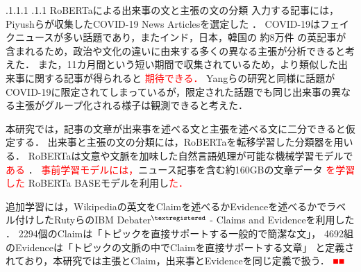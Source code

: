 \documentclass[a4paper, twocolumn, 10pt]{jarticle}
\makeatletter
\def\subsection{%
	\@startsection{subsection}{1}{\z@}%
	{.1\Cvs \@plus.1\Cdp \@minus.1\Cdp}%
	{.1\Cvs \@plus.1\Cdp}%
	{\normalfont\normalsize\bfseries}%
}
\makeatother
\begin{document}
\subsection{RoBERTaによる出来事の文と主張の文の分類}
入力する記事には，Piyushらが収集したCOVID-19 News Articlesを選定した
．
COVID-19はフェイクニュースが多い話題であり，またインド，日本，韓国の
約8万件
の英記事が含まれるため，政治や文化の違いに由来する多くの異なる主張が分析できると考えた．
また，11カ月間という短い期間で収集されているため，より類似した出来事に関する記事が得られると
\textcolor{red}{期待できる．}
Yangらの研究と同様に話題がCOVID-19に限定されてしまっているが，限定された話題でも同じ出来事の異なる主張がグループ化される様子は観測できると考えた．

本研究では，記事の文章が出来事を述べる文と主張を述べる文に二分できると仮定する．
出来事と主張の文の分類には，RoBERTaを転移学習した分類器を用いる．
RoBERTaは文意や文脈を加味した自然言語処理が可能な機械学習モデルで\textcolor{red}{ある}
．
\textcolor{red}{事前学習モデルには，}ニュース記事を含む約160GBの文章データ
\textcolor{red}{を学習した}
RoBERTa BASEモデルを利用し\textcolor{red}{た．}

追加学習には，Wikipediaの英文をClaimを述べるかEvidenceを述べるかでラベル付けしたRutyらのIBM Debater$^{\textregistered}$ - Claims and Evidenceを利用した
．
2294個のClaimは「トピックを直接サポートする一般的で簡潔な文」，
4692組のEvidenceは「トピックの文脈の中でClaimを直接サポートする文章」
と定義されており，本研究では主張とClaim，出来事とEvidenceを同じ定義で扱う．
\textcolor{red}{■■}
\end{document}
